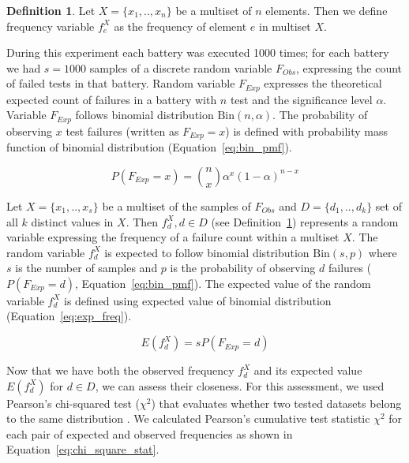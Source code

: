 \documentclass[
	digital,    %
	oneside,    %
	color,
	11pt,
	nocover,
	notable,
	nolof,
	nolot,
]{fithesis3}
\theoremstyle{definition}
\newtheorem{definition}{Definition}[section]
\theoremstyle{remark}
\begin{document}
\begin{definition}
\label{def:freq}
Let $X = \{x_1, .. ,x_n\}$ be a multiset of $n$ elements. Then we define frequency variable $f_{e}^{X}$ as the frequency of element $e$ in multiset $X$.
\end{definition}

During this experiment each battery was executed 1000 times; for each battery we had $s = 1000$ samples of a discrete random variable $F_{Obs}$, expressing the count of failed tests in that battery. Random variable $F_{Exp}$ expresses the theoretical expected count of failures in a battery with $n$ test and the significance level $\alpha$. Variable $F_{Exp}$ follows binomial distribution $\text{Bin}(n, \alpha)$. The probability of observing $x$ test failures (written as $F_{Exp} = x$) is defined with probability mass function of binomial distribution (Equation~\ref{eq:bin_pmf}).

\begin{equation}
\label{eq:bin_pmf}
P(F_{Exp} = x) = \binom nx \alpha^x (1-\alpha)^{n-x} 
\end{equation}

Let $X = \{x_1,..,x_s\}$ be a multiset of the samples of $F_{Obs}$ and $D = \{d_1,..,d_k\}$ set of all $k$ distinct values in $X$. Then $f_{d}^{X}, d \in D$ (see Definition~\ref{def:freq}) represents a random variable expressing the frequency of a failure count within a multiset $X$. The random variable $f_{d}^{X}$ is expected to follow binomial distribution $\text{Bin}(s, p)$ where $s$ is the number of samples and $p$ is the probability of observing $d$ failures ($P(F_{Exp} = d)$, Equation~\ref{eq:bin_pmf}). The expected value of the random variable $f_{d}^{X}$ is defined using expected value of binomial distribution (Equation~\ref{eq:exp_freq}).

\begin{equation}
\label{eq:exp_freq}
E\left(f_{d}^{X}\right) = s P(F_{Exp} = d)
\end{equation}

Now that we have both the observed frequency $f_{d}^{X}$ and its expected value $E\left(f_{d}^{X}\right)$ for $d \in D$, we can assess their closeness. For this assessment, we used Pearson's chi-squared test ($\chi^2$) that evaluates whether two tested datasets belong to the same distribution \cite[p.~219]{stat-handbook}. We calculated Pearson's cumulative test statistic $\chi^2$ for each pair of expected and observed frequencies as shown in Equation~\ref{eq:chi_square_stat}.
\end{document}
